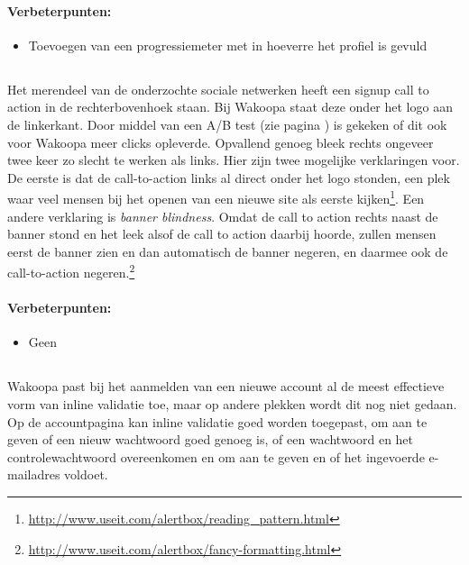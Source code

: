 \documentclass[a4paper, 10pt, pdftex]{report}
\begin{document}
      \paragraph{\textbf{Verbeterpunten:}}
      \begin{itemize}
        \item Toevoegen van een progressiemeter met in hoeverre het profiel is gevuld
      \end{itemize}

    \subsection{\cite{Editorial2008}}
    \label{wak:Editorial2008}
    Het merendeel van de onderzochte sociale netwerken heeft een signup call to action in de rechterbovenhoek staan. Bij Wakoopa staat deze onder het logo aan de linkerkant. Door middel van een A/B test (zie pagina \pageref{ctatest}) is gekeken of dit ook voor Wakoopa meer clicks opleverde. Opvallend genoeg bleek rechts ongeveer twee keer zo slecht te werken als links. Hier zijn twee mogelijke verklaringen voor. De eerste is dat de call-to-action links al direct onder het logo stonden, een plek waar veel mensen bij het openen van een nieuwe site als eerste kijken\footnote{\url{http://www.useit.com/alertbox/reading\_pattern.html}}. Een andere verklaring is \emph{banner blindness}. Omdat de call to action rechts naast de banner stond en het leek alsof de call to action daarbij hoorde, zullen mensen eerst de banner zien en dan automatisch de banner negeren, en daarmee ook de call-to-action negeren.\footnote{\url{http://www.useit.com/alertbox/fancy-formatting.html}}

      \paragraph{\textbf{Verbeterpunten:}}
      \begin{itemize}
        \item Geen
      \end{itemize}

    \subsection{\cite{Wroblewski2009}}
    Wakoopa past bij het aanmelden van een nieuwe account al de meest effectieve vorm van inline validatie toe, maar op andere plekken wordt dit nog niet gedaan. Op de accountpagina kan inline validatie goed worden toegepast, om aan te geven of een nieuw wachtwoord goed genoeg is, of een wachtwoord en het controlewachtwoord overeenkomen en om aan te geven en of het ingevoerde e-mailadres voldoet.
\end{document}
